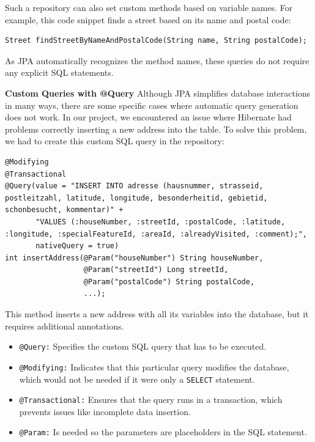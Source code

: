     Such a repository can also set custom methods based on variable names. For example, this code snippet finds a street based on its name and postal code:
    \begin{verbatim}
Street findStreetByNameAndPostalCode(String name, String postalCode);          
    \end{verbatim} 
    As JPA automatically recognizes the method names, these queries do not require any explicit SQL statements.

    \blankLine

    \textbf{Custom Queries with @Query} \newline
    Although JPA simplifies database interactions in many ways, there are some specific cases where automatic query generation does not work. In our project, we encountered an issue where Hibernate had problems correctly inserting a new address into the table. To solve this problem, we had to create this custom SQL query in the repository:
    \begin{verbatim}
@Modifying
@Transactional
@Query(value = "INSERT INTO adresse (hausnummer, strasseid, postleitzahl, latitude, longitude, besonderheitid, gebietid, schonbesucht, kommentar)" +
       "VALUES (:houseNumber, :streetId, :postalCode, :latitude, :longitude, :specialFeatureId, :areaId, :alreadyVisited, :comment);",
       nativeQuery = true)
int insertAddress(@Param("houseNumber") String houseNumber,
                  @Param("streetId") Long streetId,
                  @Param("postalCode") String postalCode,
                  ...);          
    \end{verbatim} 

    This method inserts a new address with all its variables into the database, but it requires additional annotations.
    \begin{itemize}
        \item \texttt{@Query:} Specifies the custom SQL query that has to be executed.
        \item \texttt{@Modifying:} Indicates that this particular query modifies the database, which would not be needed if it were only a \texttt{SELECT} statement.
        \item \texttt{@Transactional:} Ensures that the query runs in a transaction, which prevents issues like incomplete data insertion.
        \item \texttt{@Param:} Is needed so the parameters are placeholders in the SQL statement.
    \end{itemize}

